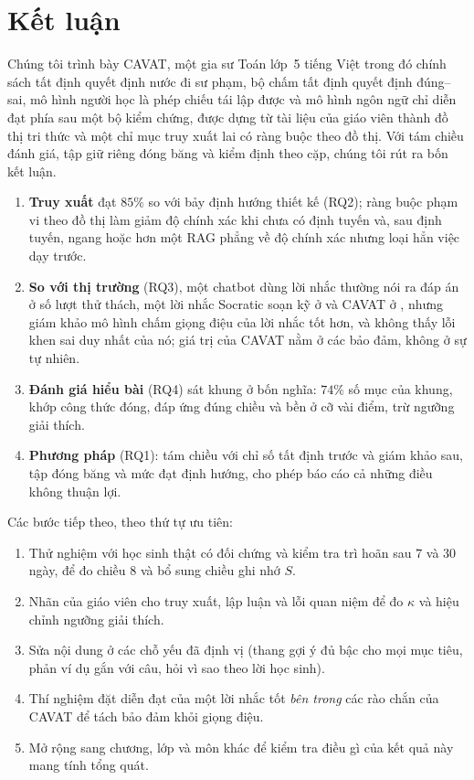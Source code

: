 \section{Kết luận}\label{sec:conclusion}

Chúng tôi trình bày CAVAT, một gia sư Toán lớp~5 tiếng Việt trong đó chính sách tất định quyết định nước đi sư phạm, bộ chấm tất định quyết định đúng--sai, mô hình người học là phép chiếu tái lập được và mô hình ngôn ngữ chỉ diễn đạt phía sau một bộ kiểm chứng, được dựng từ tài liệu của giáo viên thành đồ thị tri thức và một chỉ mục truy xuất lai có ràng buộc theo đồ thị. Với tám chiều đánh giá, tập giữ riêng đóng băng và kiểm định theo cặp, chúng tôi rút ra bốn kết luận.
\begin{enumerate}
  \item \textbf{Truy xuất} đạt $85\%$ so với bảy định hướng thiết kế (RQ2); ràng buộc phạm vi theo đồ thị làm giảm độ chính xác khi chưa có định tuyến và, sau định tuyến, ngang hoặc hơn một RAG phẳng về độ chính xác nhưng loại hẳn việc dạy trước.
  \item \textbf{So với thị trường} (RQ3), một chatbot dùng lời nhắc thường nói ra đáp án ở \BoneLeakPct{} số lượt thử thách, một lời nhắc Socratic soạn kỹ ở \BtwoLeakPct{} và CAVAT ở \CavLeakPct{}, nhưng giám khảo mô hình chấm giọng điệu của lời nhắc tốt hơn, và không thấy lỗi khen sai duy nhất của nó; giá trị của CAVAT nằm ở các bảo đảm, không ở sự tự nhiên.
  \item \textbf{Đánh giá hiểu bài} (RQ4) sát khung ở bốn nghĩa: $74\%$ số mục của khung, khớp công thức đóng, đáp ứng đúng chiều và bền ở cỡ vài điểm, trừ ngưỡng giải thích.
  \item \textbf{Phương pháp} (RQ1): tám chiều với chỉ số tất định trước và giám khảo sau, tập đóng băng và mức đạt định hướng, cho phép báo cáo cả những điều không thuận lợi.
\end{enumerate}

Các bước tiếp theo, theo thứ tự ưu tiên:
\begin{enumerate}[label=(\roman*)]
  \item Thử nghiệm với học sinh thật có đối chứng và kiểm tra trì hoãn sau $7$ và $30$ ngày, để đo chiều 8 và bổ sung chiều ghi nhớ $S$.
  \item Nhãn của giáo viên cho truy xuất, lập luận và lỗi quan niệm để đo $\kappa$ và hiệu chỉnh ngưỡng giải thích.
  \item Sửa nội dung ở các chỗ yếu đã định vị (thang gợi ý đủ bậc cho mọi mục tiêu, phản ví dụ gắn với câu, hỏi vì sao theo lời học sinh).
  \item Thí nghiệm đặt diễn đạt của một lời nhắc tốt \emph{bên trong} các rào chắn của CAVAT để tách bảo đảm khỏi giọng điệu.
  \item Mở rộng sang chương, lớp và môn khác để kiểm tra điều gì của kết quả này mang tính tổng quát.
\end{enumerate}

